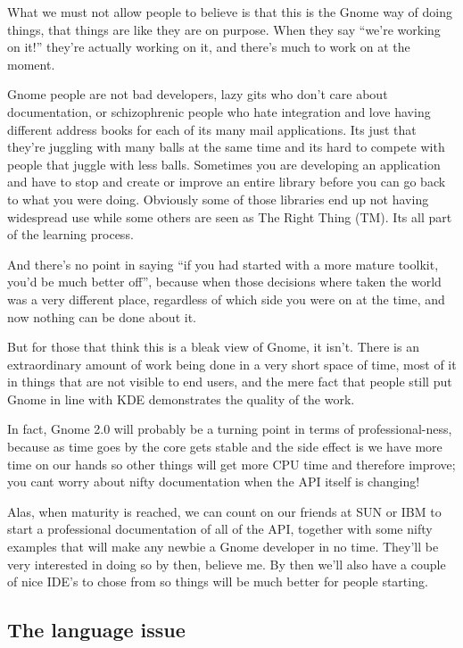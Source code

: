 \documentclass{book}
\begin{document}
What we must not allow people to believe is that this is the Gnome way
of doing things, that things are like they are on purpose. When they
say ``we're working on it!'' they're actually working on it, and
there's much to work on at the moment.

Gnome people are not bad developers, lazy gits who don't care about
documentation, or schizophrenic people who hate integration and love
having different address books for each of its many mail
applications. Its just that they're juggling with many balls at the
same time and its hard to compete with people that juggle with less
balls. Sometimes you are developing an application and have to stop
and create or improve an entire library before you can go back to what
you were doing. Obviously some of those libraries end up not having
widespread use while some others are seen as The Right Thing (TM). Its
all part of the learning process.

And there's no point in saying ``if you had started with a more mature
toolkit, you'd be much better off'', because when those decisions
where taken the world was a very different place, regardless of which
side you were on at the time, and now nothing can be done about it.

But for those that think this is a bleak view of Gnome, it
isn't. There is an extraordinary amount of work being done in a very
short space of time, most of it in things that are not visible to end
users, and the mere fact that people still put Gnome in line with KDE
demonstrates the quality of the work.

In fact, Gnome 2.0 will probably be a turning point in terms of
professional-ness, because as time goes by the core gets stable and
the side effect is we have more time on our hands so other things will
get more CPU time and therefore improve; you cant worry about nifty
documentation when the API itself is changing!

Alas, when maturity is reached, we can count on our friends at SUN or
IBM to start a professional documentation of all of the API, together
with some nifty examples that will make any newbie a Gnome developer
in no time. They'll be very interested in doing so by then, believe
me. By then we'll also have a couple of nice IDE's to chose from so
things will be much better for people starting.

\subsection{The language issue}
\end{document}

